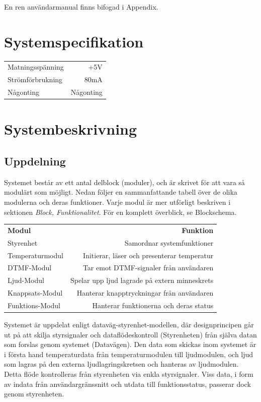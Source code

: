 \documentclass[a4paper,11pt]{article}
\begin{document}
	En ren användarmanual finns bifogad i Appendix.

\section{Systemspecifikation}

	\begin{tabular}{ l r}
	   Matningsspänning & +5V\\
	   Strömförbrukning & ~80mA\\
	   Någonting & Någonting\\
	\end{tabular}

\section{Systembeskrivning}

	\subsection{Uppdelning}

	Systemet består av ett antal delblock (moduler), och är skrivet för att vara så modulärt som möjligt.
	Nedan följer en sammanfattande tabell över de olika modulerna och deras funktioner. Varje modul är mer
	utförligt beskriven i sektionen {\it Block, Funktionalitet}. För en komplett överblick, se Blockschema.

	\begin{tabular}{ l r}
		{\bf Modul} & {\bf Funktion}\\
	   	Styrenhet & Samordnar systemfunktioner\\
	  	Temperaturmodul & Initierar, läser och presenterar temperatur\\
	   	DTMF-Modul & Tar emot DTMF-signaler från användaren\\
		Ljud-Modul & Spelar upp ljud lagrade på extern minneskrets\\
		Knappsats-Modul & Hanterar knapptryckningar från användaren\\
		Funktions-Modul & Hanterar funktionerna och deras status\\
	\end{tabular}

	Systemet är uppdelat enligt dataväg-styrenhet-modellen, där designprincipen går ut på att skilja styrsignaler
	och dataflödeskontroll (Styrenheten) från själva datan som forslas genom systemet (Datavägen). Den data som
	skickas inom systemet är i första hand temperaturdata från temperaturmodulen till ljudmodulen, och ljud som
	lagras på den externa ljudlagringskretsen och hanteras av ljudmodulen. Detta flöde kontrolleras från styrenheten via
	enkla styrsignaler. Viss data, i form av indata från användargränssnitt och utdata till funktionsstatus, passerar
	dock genom styrenheten.
\end{document}
